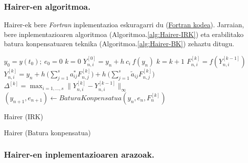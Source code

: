 \subsubsection*{Hairer-en algoritmoa.}

Hairer-ek bere \emph{Fortran} inplementazioa eskuragarri du (\href{http://www.unige.ch/~hairer/preprints.html}{Fortran kodea}). Jarraian, bere inplementazioaren algoritmoa (Algoritmoa.\ref{alg:Hairer-IRK}) eta erabilitako batura konpensatuaren teknika (Algoritmoa.\ref{alg:Hairer-BK}) zehaztu ditugu.
 
\begin{algorithm}[h!]
 \BlankLine
  $y_0=y(t_0); \ e_0=0$\;
  {
   \BlankLine
   $k=0$\;
   $Y_{n,i}^{[0]}=y_n+h \ c_i \ f(y_n) $\; 
   \BlankLine
   {
    \BlankLine 
    $k=k+1$\;
    $F_{n,i}^{[k]}=f(Y_{n,i}^{[k-1]}) $\;
    $Y_{n,i}^{[k]}=y_n+ h \ \big(\sum\limits_{j=1}^{s} a^{\ast}_{ij} F_{n,j}^{[k]} \big) 
                          + h \ \big(\sum\limits_{j=1}^{s} \tilde a_{ij} F_{n,j}^{[k]} \big)$\; 
    $\Delta ^{[k]} = \max_{i=1,\dots,s}\|Y_{n,i}^{[k]}-Y_{n,i}^{[k-1]}\|_{\infty}$\;
   }
   \BlankLine
   $(y_{n+1},e_{n+1})\leftarrow BaturaKonpensatua(y_n,e_n,F_n^{[k]})$\;      
   \BlankLine
 }
 \caption{Hairer (IRK)}
 \label{alg:Hairer-IRK}
\end{algorithm}


\begin{algorithm}[h!]
  \caption{Hairer (Batura konpensatua)}
  \label{alg:Hairer-BK}
\end{algorithm} 


\subsubsection*{Hairer-en inplementazioaren arazoak.}

